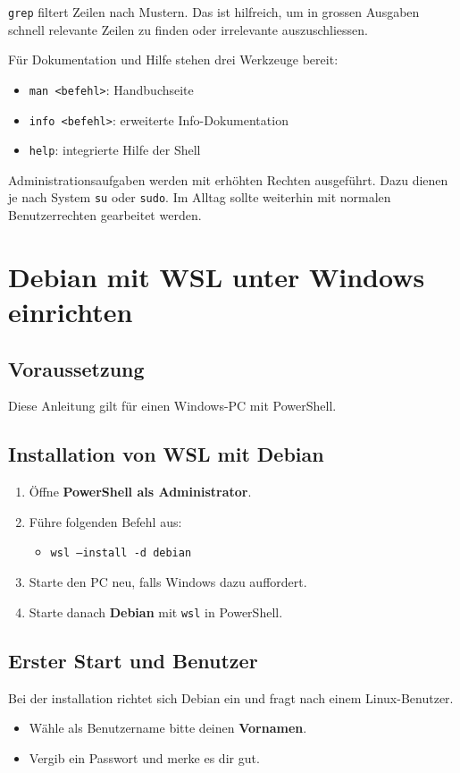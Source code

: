 \documentclass[11pt, oneside, numbers=nönddot]{scrbook}
\begin{document}
\texttt{grep} filtert Zeilen nach Mustern. Das ist hilfreich, um in grossen Ausgaben schnell relevante Zeilen zu finden oder irrelevante auszuschliessen.

Für Dokumentation und Hilfe stehen drei Werkzeuge bereit:
\begin{itemize}
\item \texttt{man <befehl>}: Handbuchseite
\item \texttt{info <befehl>}: erweiterte Info-Dokumentation
\item \texttt{help}: integrierte Hilfe der Shell
\end{itemize}

Administrationsaufgaben werden mit erhöhten Rechten ausgeführt. Dazu dienen je nach System \texttt{su} oder \texttt{sudo}. Im Alltag sollte weiterhin mit normalen Benutzerrechten gearbeitet werden.

\chapter{Debian mit WSL unter Windows einrichten}
\section{Voraussetzung}
Diese Anleitung gilt für einen Windows-PC mit PowerShell. 

\section{Installation von WSL mit Debian}
\begin{enumerate}
\item Öffne \textbf{PowerShell als Administrator}.
\item Führe folgenden Befehl aus:
\begin{itemize}
\item \texttt{wsl --install -d debian}
\end{itemize}
\item Starte den PC neu, falls Windows dazu auffordert.
\item Starte danach \textbf{Debian} mit \texttt{wsl} in PowerShell.
\end{enumerate}

\section{Erster Start und Benutzer}
Bei der installation richtet sich Debian ein und fragt nach einem Linux-Benutzer.
\begin{itemize}
\item Wähle als Benutzername bitte deinen \textbf{Vornamen}.
\item Vergib ein Passwort und merke es dir gut.
\end{itemize}
\end{document}
